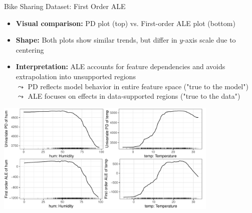 \documentclass[11pt,compress,t,notes=noshow, aspectratio=169, xcolor=table]{beamer}
\begin{document}
\begin{frame}{Bike Sharing Dataset: First Order ALE}

\begin{itemize}
  \item \textbf{Visual comparison:} PD plot (top) vs. First-order ALE plot (bottom)
  \item \textbf{Shape:} Both plots show similar trends, but differ in $y$-axis scale due to centering
  \item \textbf{Interpretation:} ALE accounts for feature dependencies and avoids extrapolation into unsupported regions
  \\$\leadsto$ PD reflects model behavior in entire feature space ("true to the model")\\
  $\leadsto$ ALE focuses on effects in data-supported regions ("true to the data")
\end{itemize}

\begin{center}
\includegraphics[width=0.8\textwidth]{figure/ale1d}
\end{center}


\end{frame}

\end{document}
